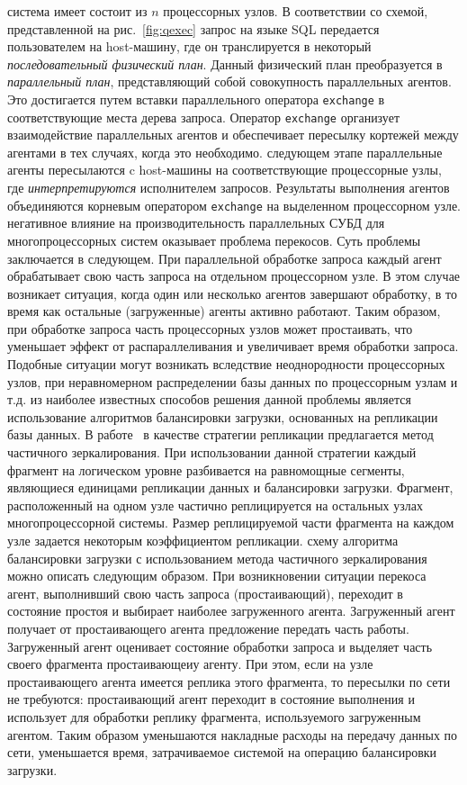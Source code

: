 \documentclass[11pt,oneside]{article}
\begin{document}
 система имеет состоит из $n$ процессорных узлов. В соответствии со схемой, представленной на рис.~\ref{fig:qexec} запрос на языке SQL передается пользователем на host-машину, где он транслируется в некоторый \textit{последовательный физический план}. Данный физический план преобразуется в \textit{параллельный план}, представляющий собой совокупность параллельных агентов. Это достигается путем вставки параллельного оператора \texttt{exchange} в соответствующие места дерева запроса. Оператор \texttt{exchange} организует взаимодействие параллельных агентов и обеспечивает пересылку кортежей между агентами в тех случаях, когда это необходимо.
 следующем этапе параллельные агенты пересылаются c host-машины на соответствующие процессорные узлы, где \textit{интерпретируются} исполнителем запросов. Результаты выполнения агентов объединяются корневым оператором \texttt{exchange} на выделенном процессорном узле.
 негативное влияние на производительность параллельных СУБД для многопроцессорных систем оказывает проблема перекосов. Суть проблемы заключается в следующем. При параллельной обработке запроса каждый агент обрабатывает свою часть запроса на отдельном процессорном узле. В этом случае возникает ситуация, когда один или несколько агентов завершают обработку, в то время как остальные (загруженные) агенты активно работают. Таким образом, при обработке запроса часть процессорных узлов может простаивать, что уменьшает эффект от распараллеливания и увеличивает время обработки запроса. Подобные ситуации могут возникать вследствие неоднородности процессорных узлов, при неравномерном распределении базы данных по процессорным узлам и т.д.
 из наиболее известных способов решения данной проблемы является использование алгоритмов балансировки загрузки, основанных на репликации базы данных. В работе~\cite{B_Lepikhov2006} в качестве стратегии репликации предлагается метод частичного зеркалирования. При использовании данной стратегии каждый фрагмент на логическом уровне разбивается на равномощные сегменты, являющиеся единицами репликации данных и балансировки загрузки. Фрагмент, расположенный на одном узле частично реплицируется на остальных узлах многопроцессорной системы. Размер реплицируемой части фрагмента на каждом узле задается некоторым коэффициентом репликации. 
 схему алгоритма балансировки загрузки с использованием метода частичного зеркалирования можно описать следующим образом. При возникновении ситуации перекоса агент, выполнивший свою часть запроса (простаивающий), переходит в состояние простоя и выбирает наиболее загруженного агента. Загруженный агент получает от простаивающего агента предложение передать часть работы. Загруженный агент оценивает состояние обработки запроса и выделяет часть своего фрагмента  простаивающеиу агенту. При этом, если на узле простаивающего агента имеется реплика этого фрагмента, то пересылки по сети не требуются: простаивающий агент переходит в состояние выполнения и использует для обработки реплику фрагмента, используемого загруженным агентом. Таким образом уменьшаются накладные расходы на передачу данных по сети, уменьшается время, затрачиваемое системой на операцию балансировки загрузки.
\end{document}
